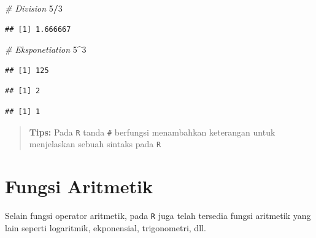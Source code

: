 \documentclass[]{book}
\newenvironment{Shaded}{\begin{snugshade}}{\end{snugshade}}
\newcommand{\CommentTok}[1]{\textcolor[rgb]{0.56,0.35,0.01}{\textit{#1}}}
\newcommand{\DecValTok}[1]{\textcolor[rgb]{0.00,0.00,0.81}{#1}}
\newcommand{\OperatorTok}[1]{\textcolor[rgb]{0.81,0.36,0.00}{\textbf{#1}}}
\theoremstyle{definition}
\theoremstyle{definition}
\theoremstyle{definition}
\theoremstyle{remark}
\begin{document}
\begin{Shaded}
\begin{Highlighting}[]
\CommentTok{# Division}
\DecValTok{5}\OperatorTok{/}\DecValTok{3}
\end{Highlighting}
\end{Shaded}

\begin{verbatim}
## [1] 1.666667
\end{verbatim}

\begin{Shaded}
\begin{Highlighting}[]
\CommentTok{# Eksponetiation}
\DecValTok{5}\OperatorTok{^}\DecValTok{3}
\end{Highlighting}
\end{Shaded}

\begin{verbatim}
## [1] 125
\end{verbatim}

\begin{Shaded}
\end{Shaded}

\begin{verbatim}
## [1] 2
\end{verbatim}

\begin{Shaded}
\end{Shaded}

\begin{verbatim}
## [1] 1
\end{verbatim}

\begin{quote}
\textbf{Tips:} Pada \texttt{R} tanda \texttt{\#} berfungsi menambahkan keterangan untuk menjelaskan sebuah sintaks pada \texttt{R}
\end{quote}

\hypertarget{aritmaticfunction}{%
\section{Fungsi Aritmetik}\label{aritmaticfunction}}

Selain fungsi operator aritmetik, pada \texttt{R} juga telah tersedia fungsi aritmetik yang lain seperti logaritmik, ekponensial, trigonometri, dll.
\end{document}
